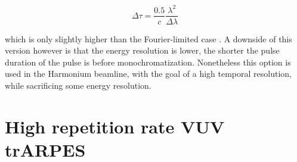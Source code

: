 \begin{equation}
	\Delta\tau = \frac{0.5}{c}\frac{\lambda^2}{\Delta\lambda}
\end{equation}

which is only slightly higher than the Fourier-limited case \cite{poletto_time-preserving_2010,nugent-glandorf_laser-based_2002,poletto_time-compensated_2004,poletto_time-delay_2006}.
A downside of this version however is that the energy resolution is lower, the shorter the pulse duration of the pulse is before monochromatization.
Nonetheless this option is used in the Harmonium beamline, with the goal of a high temporal resolution, while sacrificing some energy resolution.

\section{High repetition rate VUV trARPES}
\label{sec:high_rep_vuv}

